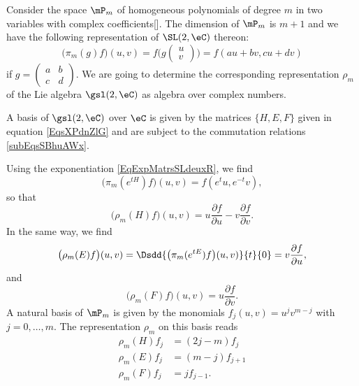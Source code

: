 Consider the space $\mP_m$ of homogeneous polynomials of degree $m$ in two variables with complex coefficients[\cite{GpAlgLie_Faraut}]. The dimension of $\mP_m$ is $m+1$ and we have the following representation of $\SL(2,\eC)$ thereon:
\begin{equation}
	\big( \pi_m(g)f \big)(u,v)=f\big(
	g
	\begin{pmatrix}
		u \\v
	\end{pmatrix}
	\big)
	=
	f(au+bv,cu+dv)
\end{equation}
if $g=\begin{pmatrix}
		a & b \\
		c & d
	\end{pmatrix}$. We are going to determine the corresponding representation $\rho_m$ of the Lie algebra $\gsl(2,\eC)$ as algebra over complex numbers.

A basis of $\gsl(2,\eC)$ over $\eC$ is given by the matrices $\{ H,E,F \}$ given in equation \eqref{EqsXPdnZlG} and are subject to the commutation relations \eqref{subEqsSBhuAWx}.




Using the exponentiation \eqref{EqExpMatrsSLdeuxR}, we find
\[
	\big( \pi_m( e^{tH})f \big)(u,v)=f( e^{t}u, e^{-t}v),
\]
so that
\begin{equation}
	\big( \rho_m(H)f \big)(u,v)=u\frac{ \partial f }{ \partial u }-v\frac{ \partial f }{ \partial v }.
\end{equation}
In the same way, we find
\begin{equation}
	\big( \rho_m(E)f \big)(u,v)=\Dsdd{ \big( \pi_m( e^{tE})f \big)(u,v) }{t}{0}=v\frac{ \partial f }{ \partial u },
\end{equation}
and
\begin{equation}
	\big( \rho_m(F)f \big)(u,v)=u \frac{ \partial f }{ \partial v }.
\end{equation}
A natural basis of $\mP_m$ is given by the monomials $f_j(u,v)=u^jv^{m-j}$ with $j=0,\ldots,m$. The representation $\rho_m$ on this basis reads
\begin{equation}        \label{EqReprezgsldeuxC}
	\begin{split}
		\rho_m(H)f_j&=(2j-m)f_j\\
		\rho_m(E)f_j&=(m-j)f_{j+1}\\
		\rho_m(F)f_j&=jf_{j-1}.
	\end{split}
\end{equation}


